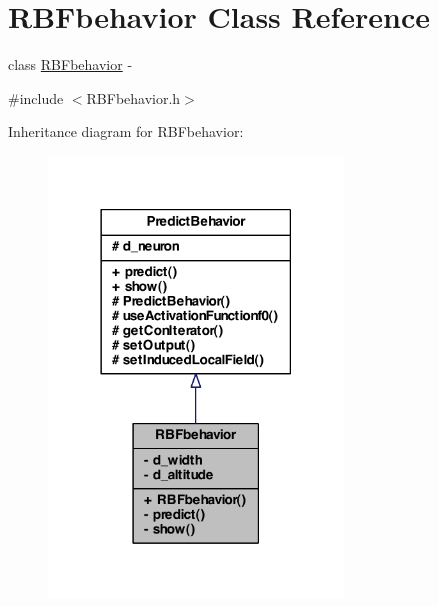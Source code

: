 \hypertarget{class_r_b_fbehavior}{
\section{RBFbehavior Class Reference}
\label{class_r_b_fbehavior}
}


class \hyperlink{class_r_b_fbehavior}{RBFbehavior} -\/  




{\ttfamily \#include $<$RBFbehavior.h$>$}



Inheritance diagram for RBFbehavior:\nopagebreak
\begin{figure}[H]
\begin{center}
\leavevmode
\includegraphics[width=222pt]{class_r_b_fbehavior__inherit__graph}
\end{center}
\end{figure}


